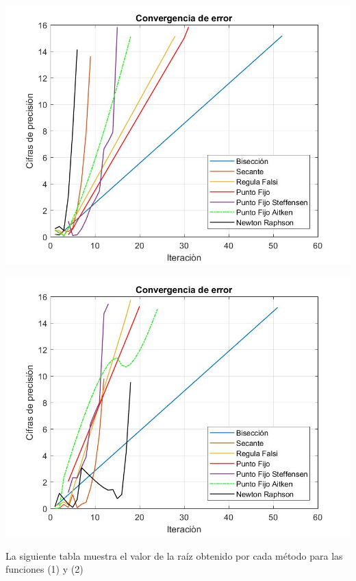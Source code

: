 \documentclass{memoria}
\begin{document}
{\includegraphics[width=15cm]{imagenes/NL/Errores1.jpg}}

{\includegraphics[width=15cm]{imagenes/NL/Errores2.jpg}}


La siguiente tabla muestra el valor de la raíz obtenido por cada método para las funciones (1) y (2)
\end{document}
